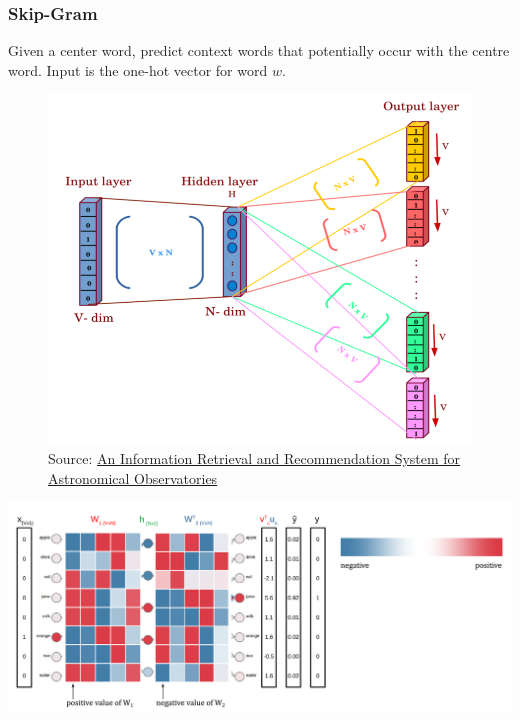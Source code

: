\documentclass[11pt]{article}
\begin{document}
\subsubsection{Skip-Gram}
\begin{minipage}{0.6\linewidth}
	Given a center word, predict context words that potentially occur with 	the centre word. Input is the one-hot vector for word $w$.
	\vspace{10em}
\end{minipage}
\begin{minipage}{0.4\linewidth}
\begin{figure}[H]
	\centering
	\includegraphics[width=0.9\linewidth]{img/word2vec_skip-gram}
	\caption{Source: \href{https://inspirehep.net/literature/1630982}{An Information Retrieval and Recommendation System for Astronomical Observatories}}
	\label{fig:word2vecskip-gram}
\end{figure}
\end{minipage}
\begin{center}
	\includegraphics[width=0.9\linewidth]{img/word2vec_example}
\end{center}
\end{document}
